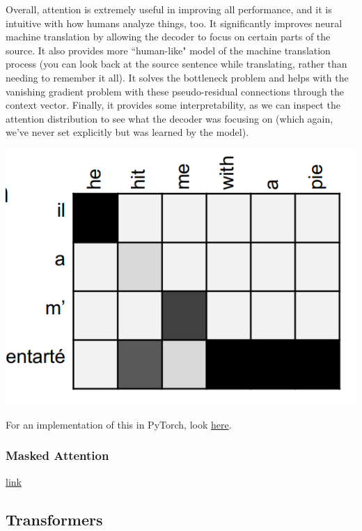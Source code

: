 \documentclass{article}
\begin{document}
    Overall, attention is extremely useful in improving all performance, and it is intuitive with how humans analyze things, too. It significantly improves neural machine translation by allowing the decoder to focus on certain parts of the source. It also provides more ``human-like" model of the machine translation process (you can look back at the source sentence while translating, rather than needing to remember it all). It solves the bottleneck problem and helps with the vanishing gradient problem with these pseudo-residual connections through the context vector. Finally, it provides some interpretability, as we can inspect the attention distribution to see what the decoder was focusing on (which again, we've never set explicitly but was learned by the model). 
    \begin{center}
      \includegraphics[scale=0.3]{img/10_Attention/attention_distribution.png}
    \end{center}

    \begin{code}
      For an implementation of this in PyTorch, look \href{code/seq2seq_attention.ipynb}{here}.
    \end{code}

    \subsubsection{Masked Attention}

    \href{https://stackoverflow.com/questions/58127059/how-to-understand-masked-multi-head-attention-in-transformer}{link}

  \subsection{Transformers} 
\end{document}
